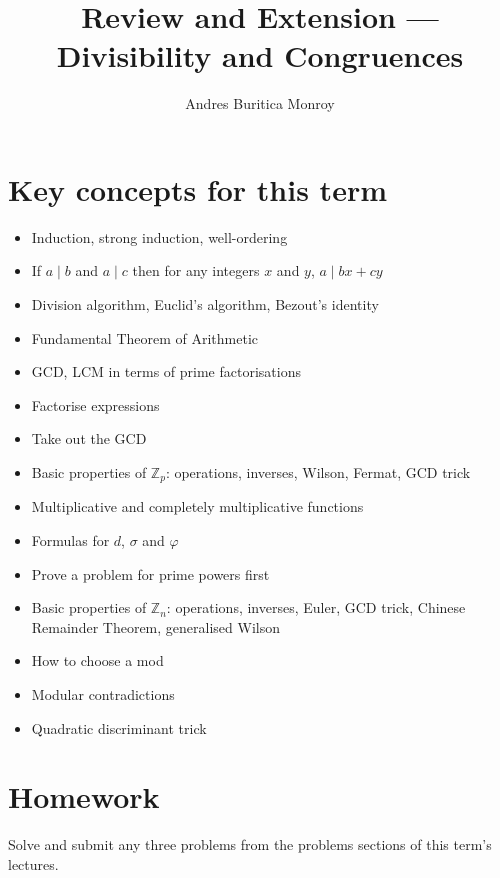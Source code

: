 \documentclass{article}
\title{Review and Extension --- Divisibility and Congruences}
\author{Andres Buritica Monroy}
\date{}
\begin{document}
\maketitle
\section{Key concepts for this term}
\begin{itemize}
	\item Induction, strong induction, well-ordering
	\item If $a\mid b$ and $a\mid c$ then for any integers $x$ and $y$, $a\mid
		      bx+cy$
	\item Division algorithm, Euclid's algorithm, Bezout's identity
	\item Fundamental Theorem of Arithmetic
	\item GCD, LCM in terms of prime factorisations
	\item Factorise expressions
	\item Take out the GCD
	\item Basic properties of $\mathbb Z_p$: operations, inverses, Wilson,
	      Fermat, GCD trick
	\item Multiplicative and completely multiplicative functions
	\item Formulas for $d$, $\sigma$ and $\varphi$
	\item Prove a problem for prime powers first
	\item Basic properties of $\mathbb Z_n$: operations, inverses,
	      Euler, GCD trick, Chinese Remainder Theorem, generalised Wilson
	\item How to choose a mod
	\item Modular contradictions
	\item Quadratic discriminant trick
\end{itemize}
\section{Homework}
Solve and submit any three problems from the problems sections of this term's
lectures.
\newpage
\end{document}
